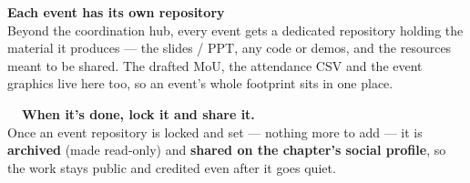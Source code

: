\documentclass[11pt,a4paper]{article}
\begin{document}
\vspace{16pt}
{\bfseries\color{Ink}Each event has its own repository}\\[2pt]
Beyond the coordination hub, every event gets a dedicated repository holding the material it produces
— the slides / PPT, any code or demos, and the resources meant to be shared. The drafted MoU, the
attendance CSV and the event graphics live here too, so an event's whole footprint sits in one place.

\vspace{8pt}
\begin{tcolorbox}[enhanced,colback=Mist,colframe=Mist,arc=4pt,left=14pt,right=14pt,top=10pt,bottom=10pt,
    borderline west={3pt}{0pt}{GGrn}]
  {\bfseries\color{Ink}~~When it's done, lock it and share it.}\\[2pt]
  {\small\color{Slate}Once an event repository is locked and set — nothing more to add — it is
  \textbf{archived} (made read-only) and \textbf{shared on the chapter's social profile}, so the work
  stays public and credited even after it goes quiet.}
\end{tcolorbox}
\clearpage
\end{document}

